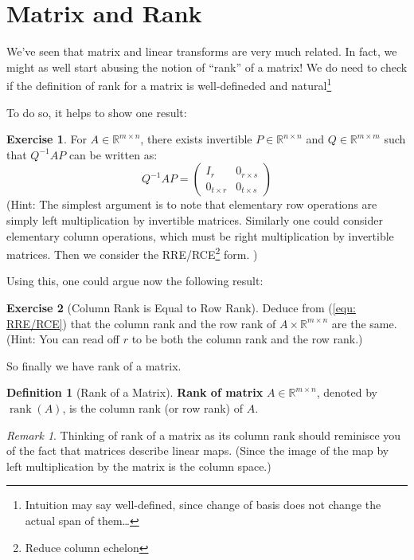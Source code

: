 \documentclass[12pt, a4paper]{article}
\newcommand{\R}{\mathbb{R}}
\DeclareMathOperator{\Rank}{rank}
\theoremstyle{remark}
\newtheorem{remark}{Remark}
\theoremstyle{definition}
\newtheorem{definition}{Definition}
\newtheorem{exercise}{Exercise}
\numberwithin{equation}{section}
\numberwithin{definition}{section}
\numberwithin{example}{section}
\numberwithin{exercise}{section}
\numberwithin{remark}{section}
\numberwithin{figure}{section}
\begin{document}
\section{Matrix and Rank}
We've seen that matrix and linear transforms are very much related.
In fact, we might as well start abusing the notion of ``rank'' of a matrix!
We do need to check if the definition of rank for a matrix is well-defineded and natural\footnote{
    Intuition may say well-defined, since change of basis does not change the actual span of them\dots
}

To do so, it helps to show one result:
\begin{exercise}
    For $A \in \R^{m \times n}$, there exists invertible $P \in \R^{n \times n}$ and $Q \in \R^{m \times m}$ 
    such that $Q^{-1}AP$ can be written as:
    \begin{equation}
        Q^{-1}AP =
        \begin{pmatrix}
            I_{r} & 0_{r \times s} \\ 0_{t \times r} & 0_{t \times s}
        \end{pmatrix}
        \label{equ: RRE/RCE}
    \end{equation}
    (Hint: The simplest argument is to note that elementary row operations are simply left multiplication by invertible matrices.
    Similarly one could consider elementary column operations, which must be right multiplication by invertible matrices.
    Then we consider the RRE/RCE\footnote{Reduce column echelon} form.
)
\end{exercise}
Using this, one could argue now the following result:
\begin{exercise}[Column Rank is Equal to Row Rank]
    Deduce from (\ref{equ: RRE/RCE}) that the column rank and the row rank of $A \times \R^{m \times n}$ are the same.
    (Hint: You can read off $r$ to be both the column rank and the row rank.)
\end{exercise}
So finally we have rank of a matrix.
\begin{definition}[Rank of a Matrix]
    \textbf{Rank of matrix} $A \in \R^{m \times n}$, denoted by $\Rank (A)$,
    is the column rank (or row rank) of $A$.
\end{definition}
\begin{remark}
    Thinking of rank of a matrix as its column rank should reminisce you of the fact that
    matrices describe linear maps. 
    (Since the image of the map by left multiplication by the matrix is the column space.)
\end{remark}
\end{document}
